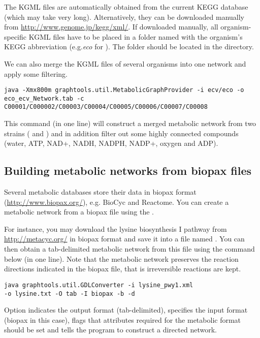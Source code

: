 The KGML files are automatically obtained from the current KEGG database
(which may take very long). Alternatively, they can be downloaded manually from
\url{http://www.genome.jp/kegg/xml/}.
If downloaded manually, all organism-specific KGML files have to be placed in a
folder named with the organism's KEGG abbreviation (e.g.\textit{eco}
for ). The folder should be located in the \RSAT{}
directory.
 
We can also merge the KGML files of several organisms into one network and apply
some filtering.

\begin{verbatim}
java -Xmx800m graphtools.util.MetabolicGraphProvider -i ecv/eco -o
eco_ecv_Network.tab -c C00001/C000002/C00003/C00004/C00005/C00006/C00007/C00008
\end{verbatim}

This command (in one line) will construct a merged metabolic network from two
 strains ( and ) 
and in addition filter out some highly connected compounds (water, ATP, NAD+, NADH, NADPH, NADP+, oxygen and ADP).

\subsection{Building metabolic networks from biopax files}

Several metabolic databases store their data in biopax format
(\url{http://www.biopax.org/}), e.g. BioCyc and Reactome. You can create
a metabolic network from a biopax file using the
.

For instance, you may download the lysine biosynthesis I pathway from
\url{http://metacyc.org/} in biopax format and save it into a file named
. You can then obtain a tab-delimited metabolic network
from this file using the command below (in one line). Note that the metabolic
network preserves the reaction directions indicated in the biopax file, that is irreversible reactions are
kept.

\begin{verbatim}
java graphtools.util.GDLConverter -i lysine_pwy1.xml 
-o lysine.txt -O tab -I biopax -b -d
\end{verbatim}

Option  indicates the output format (tab-delimited), 
specifies the input format (biopax in this case),  flags that
attributes required for the metabolic format should be set and  tells
the program to construct a directed network.

